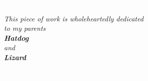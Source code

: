 \textcolor{white}{.}

\vspace{1 in} 

\begin{center}
{\itshape{\Large This piece of work is wholeheartedly dedicated\\ \vspace{10pt}
\Large to my parents\\ \vspace{10pt}   
\textbf{\huge Hatdog}\\ \vspace{10pt} 
\Large and\\ \vspace{10pt} 
\textbf{\huge Lizard}}}

\end{center}

\textcolor{white}{.}